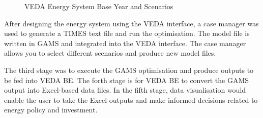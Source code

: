 \documentclass[12pt]{article}
\begin{document}
\begin{figure}[H]
    \centering
	\caption{VEDA Energy System Base Year and Scenarios}
	\label{fig:BYS}%
\end{figure}


After designing the energy system using the VEDA interface, a case manager was used to generate a TIMES text file and 
run the optimisation. The model file is written in GAMS and integrated into the VEDA interface. 
The case manager allows you to select different scenarios and produce new model files.

The third stage was to execute the GAMS optimisation and produce outputs to be fed into VEDA BE. 
The forth stage is for VEDA BE to convert the GAMS output into Excel-based data files. 
In the fifth stage, data visualisation would enable the user to take the Excel outputs and make informed decisions related to energy policy and investment.
\end{document}
